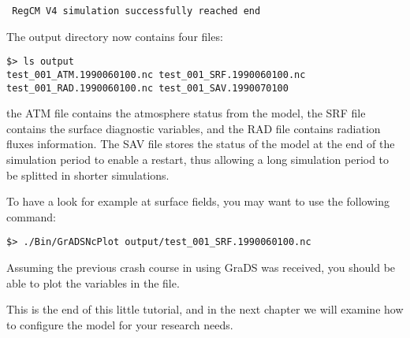 \begin{Verbatim}
 RegCM V4 simulation successfully reached end
\end{Verbatim}

The output directory now contains four files:

\begin{Verbatim}
$> ls output
test_001_ATM.1990060100.nc test_001_SRF.1990060100.nc
test_001_RAD.1990060100.nc test_001_SAV.1990070100
\end{Verbatim}

the ATM file contains the atmosphere status from the model, the SRF file
contains the surface diagnostic variables, and the RAD file contains radiation
fluxes information. The SAV file stores the status of the model at the end of
the simulation period to enable a restart, thus allowing a long simulation
period to be splitted in shorter simulations.

To have a look for example at surface fields, you may want to use the
following command:

\begin{Verbatim}
$> ./Bin/GrADSNcPlot output/test_001_SRF.1990060100.nc
\end{Verbatim}

Assuming the previous crash course in using GraDS was received, you should be
able to plot the variables in the file.

This is the end of this little tutorial, and in the next chapter we will
examine how to configure the model for your research needs.

